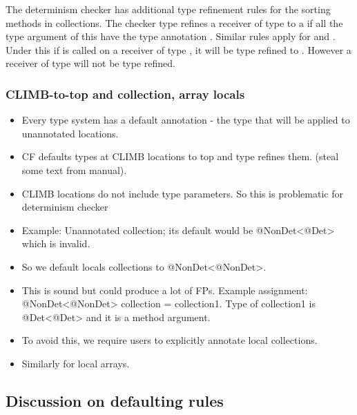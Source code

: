 The determinism checker has additional type refinement rules for the sorting methods in collections. 
The checker type refines a receiver of type  to a  if all the
type argument of this  have the type annotation . Similar rules apply for  and
.
Under this if  is called on a receiver of type , it will
be type refined to . However a receiver of type  will not be type refined.

\subsubsection{CLIMB-to-top and collection, array locals}

\begin{itemize}
	\item Every type system has a default annotation - the type that will be applied to unannotated locations.
	\item CF defaults types at CLIMB locations to top and type refines them. (steal some text from manual).
	\item CLIMB locations do not include type parameters. So this is problematic for determinism checker
	\item Example: Unannotated collection; its default would be @NonDet<@Det> which is invalid.
	\item So we default locals collections to @NonDet<@NonDet>. 
	\item This is sound but could produce a lot of FPs. Example assignment: @NonDet<@NonDet> collection = collection1.
	Type of collection1 is @Det<@Det> and it is a method argument.
	\item To avoid this, we require users to explicitly annotate local collections.
	\item Similarly for local arrays.
\end{itemize}

\subsection{Discussion on defaulting rules}

